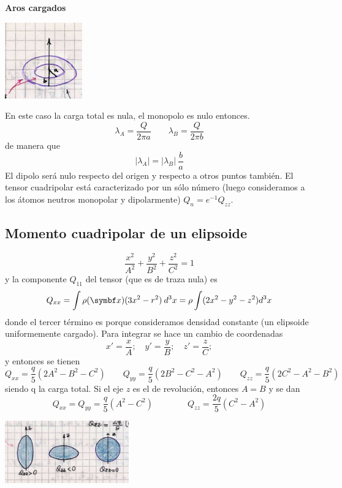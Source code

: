 \documentclass[10pt,oneside]{CBFT_book}
\begin{document}
\begin{ejemplo}{\bf Aros cargados}


\includegraphics[width=0.25\textwidth]{images/fig_ft1_aros_cargados.jpg}

En este caso la carga total es nula, el monopolo es nulo entonces.
\[
	\lambda_A = \frac{Q}{2 \pi a } \qquad \lambda_B = \frac{Q}{2 \pi b }
\]
de manera que 
\[
	|\lambda_A| = | \lambda_B | \: \frac{b}{a}
\]
El dipolo será nulo respecto del origen y respecto a otros puntos también.
El tensor cuadripolar está caracterizado por un sólo número (luego consideramos a los átomos neutros
monopolar y dipolarmente) $ Q_n = e^{-1} Q_{zz}$.
\end{ejemplo}

\subsection{Momento cuadripolar de un elipsoide}

\[
	\frac{x^2}{A^2} + \frac{y^2}{B^2} + \frac{z^2}{C^2} = 1
\]
y la componente $Q_{11}$ del tensor (que es de traza nula) es
\[
	Q_{xx} = \int \rho( \vbx ) ( 3x^2 - r^2 ) \: d^3x = \rho \int ( 2 x^2 - y^2 - z^2 ) d^3x
\]
donde el tercer término es porque consideramos densidad constante (un elipsoide uniformemente cargado).
Para integrar se hace un cambio de coordenadas
\[
	x'= \frac{x}{A}; \quad y'= \frac{y}{B}; \quad z'= \frac{z}{C};
\]
y entonces se tienen
\[
	Q_{xx} = \frac{q}{5}(2A^2-B^2-C^2) \qquad 
	Q_{yy} = \frac{q}{5}(2B^2-C^2-A^2)  \qquad 
	Q_{zz} = \frac{q}{5}(2C^2-A^2-B^2)
\]
siendo q la carga total. Si el eje $z$ es el de revolución, entonces $A=B$ y se dan
\[
	Q_{xx} = Q_{yy} = \frac{q}{5}(A^2-C^2) \qquad \qquad Q_{zz} = \frac{2q}{5}(C^2-A^2)
\]


\includegraphics[width=0.4\textwidth]{images/fig_ft1_3elipsoides.jpg}	
\end{document}
